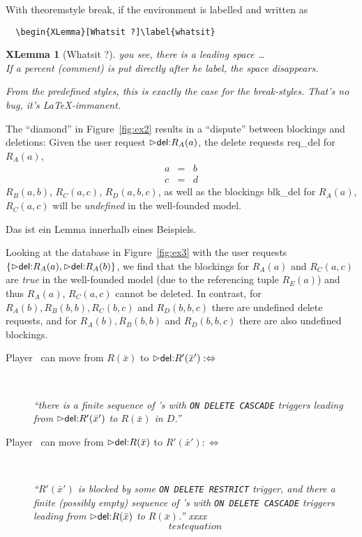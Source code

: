\documentclass[twoside,11pt]{article}
\theoremstyle{lines}
\newtheorem*{XLemma}{XLemma}
\theoremstyle{longplain}
\begin{document}
 With theoremstyle break, if the environment is labelled and written as
 \begin{verbatim}
  \begin{XLemma}[Whatsit ?]\label{whatsit} \end{verbatim}
  \begin{XLemma}[Whatsit ?]\label{whatsit}
  you see, there is a leading space \dots \\
 If a percent (comment) is put directly after he label, the space 
disappears.

 From the predefined styles, this is exactly the case for the break-styles.
 That's no bug, it's \LaTeX-immanent.
 \end{XLemma}


\begin{Example}
  The ``diamond'' in Figure~\ref{fig:ex2} results in a ``dispute''
  between blockings and deletions: Given the user request $\extev \del
  R_A(a)$, the delete requests \textsf{req\_del} for $R_A(a)$,
  \begin{eqnarray}
    a &=& b \\
    c &=& d    
  \end{eqnarray}
  $R_B(a,b)$, $R_C(a,c)$, $R_D(a,b,c)$, as well as the blockings
  \textsf{blk\_del} for $R_A(a)$, $R_C(a,c)$ will be \emph{undefined}
  in the well-founded model.
\begin{Lemma}
Das ist ein Lemma innerhalb eines Beispiels.
\end{Lemma}
  Looking at the database in Figure~\ref{fig:ex3} with the user
  requests $\{\extev \del R_A(a), \extev \del R_A(b)\}$, we find that
  the blockings for $R_A(a)$ and $R_C(a,c)$ are \emph{true} in the
  well-founded model (due to the referencing tuple $R_E(a)$) and thus
  $R_A(a)$, $R_C(a,c)$ cannot be deleted. In contrast, for
  $R_A(b), R_B(b,b), R_C(b,c)$ and $R_D(b,b,c)$ there are undefined
  delete requests, and for $R_A(b), R_B(b,b)$ and $R_D(b,b,c)$ there
  are also undefined blockings.
\end{Example}
\begin{Definition}
\begin{description}
\item[Player \I\ can move from $R(\bar x)$ to $\extev \del R'(\bar x'):
  \Leftrightarrow$]\
  
  \emph{``there is a finite sequence of \ric's with \texttt{ON DELETE
      CASCADE} triggers leading from $\extev \del R'(\bar x')$ to
    $R(\bar x)$ in $D$.''}
\item[Player \II\ can move from $\extev \del R(\bar x)$ to $R'(\bar
  x'):\Leftrightarrow$]\ 
  
  \emph{``$R'(\bar x')$ is blocked by some \texttt{ON DELETE RESTRICT}
    trigger, and there a finite (possibly empty) sequence of \ric's
    with \texttt{ON DELETE CASCADE} triggers leading from $\extev \del
    R(\bar x)$ to $R(\bar x)$.'' xxxx}
\begin{equation}
  testequation    
\end{equation}
\end{description}
\end{Definition}
\end{document}
